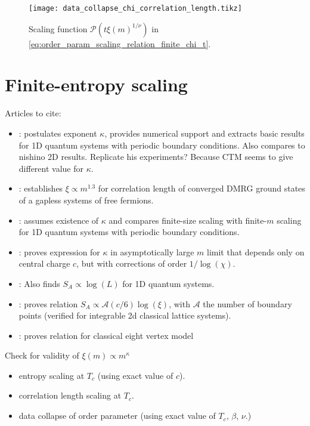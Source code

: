 \begin{figure}
  \texttt{[image: data\_collapse\_chi\_correlation\_length.tikz]}
  \caption{Scaling function $\mathcal{P}(t \xi(m)^{1/\nu})$ in
  \autoref{eq:order_param_scaling_relation_finite_chi_t}.}\label{fig:data_collapse_chi_correlation_length}
\end{figure}

\section{Finite-entropy scaling}

Articles to cite:

\begin{itemize}

\item \cite{tagliacozzo2008scaling}: postulates exponent $\kappa$, provides numerical support and extracts basic results
for 1D quantum systems with periodic boundary conditions. Also compares to nishino 2D results. Replicate his
experiments? Because CTM seems to give different value for $\kappa$.
\item \cite{andersson1999density}: establishes $\xi \propto m^{1.3}$ for correlation length of converged DMRG ground
states of a gapless systems of free fermions.
\item \cite{pirvu2012matrix}: assumes existence of $\kappa$ and compares finite-size scaling with finite-$m$ scaling
for 1D quantum systems with periodic boundary conditions.
\item \cite{pollmann2009theory}: proves expression for $\kappa$ in asymptotically large $m$ limit that depends only on
central charge $c$, but with corrections of order $1 / \log(\chi)$.
\item \cite{vidal2003entanglement}: Also finds $S_A \propto \log(L)$ for 1D quantum systems.
\item \cite{calabrese2004entanglement}: proves relation $S_A \propto \mathcal{A}(c/6)\log(\xi)$, with $\mathcal{A}$
the number of boundary points (verified for integrable 2d classical lattice systems).
\item \cite{ercolessi2010exact}: proves relation for classical eight vertex model
\end{itemize}

Check for validity of $\xi(m) \propto m^{\kappa}$

\begin{itemize}
  \item entropy scaling at $T_c$ (using exact value of $c$).
  \item correlation length scaling at $T_c$.
  \item data collapse of order parameter (using exact value of $T_c$, $\beta$, $\nu$.)
\end{itemize}



